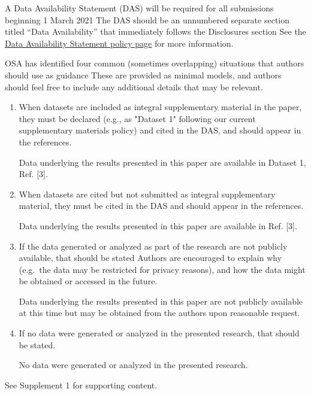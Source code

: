 \documentclass{osa-article}
\begin{document}
\begin{backmatter}
A Data Availability Statement (DAS) will be required for all submissions beginning 1 March 2021
The DAS should be an unnumbered separate section titled ``Data Availability'' that
immediately follows the Disclosures section
See the \href{https://www.osapublishing.org/submit/review/data-availability-policy.cfm}{Data Availability Statement policy page} for more information.

OSA has identified four common (sometimes overlapping) situations that authors should use as guidance
These are provided as minimal models, and authors should feel free to
include any additional details that may be relevant.

\begin{enumerate}
\item When datasets are included as integral supplementary material in the paper, they must be declared (e.g., as "Dataset 1" following our current supplementary materials policy) and cited in the DAS, and should appear in the references.

 Data underlying the results presented in this paper are available in Dataset 1, Ref. [3].

\bigskip

\item When datasets are cited but not submitted as integral supplementary material, they must be cited in the DAS and should appear in the references.

 Data underlying the results presented in this paper are available in Ref. [3].

\bigskip

\item If the data generated or analyzed as part of the research are not publicly available, that should be stated
Authors are encouraged to explain why (e.g.~the data may be restricted for privacy reasons), and how the data might be obtained or accessed in the future.

 Data underlying the results presented in this paper are not publicly available at this time but may be obtained from the authors upon reasonable request.

\bigskip

\item If no data were generated or analyzed in the presented research, that should be stated.

 No data were generated or analyzed in the presented research.
\end{enumerate}


See Supplement 1 for supporting content.

\end{backmatter}
\end{document}
